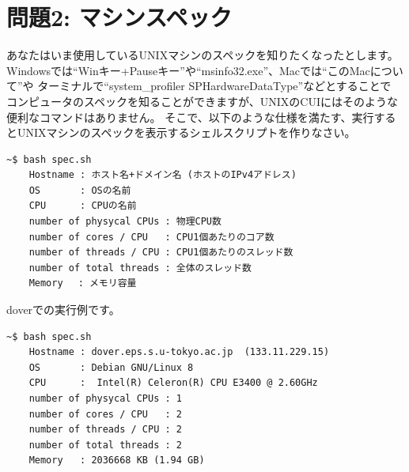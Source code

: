 \documentclass[a4j]{ltjreport}
\begin{document}
    \section*{問題2: マシンスペック}
    あなたはいま使用しているUNIXマシンのスペックを知りたくなったとします。
    Windowsでは``Winキー+Pauseキー''や``msinfo32.exe''、Macでは``このMacについて''や
    ターミナルで``system\_profiler SPHardwareDataType''などとすることで
    コンピュータのスペックを知ることができますが、UNIXのCUIにはそのような便利なコマンドはありません。
    そこで、以下のような仕様を満たす、実行するとUNIXマシンのスペックを表示するシェルスクリプトを作りなさい。

    \begin{lstlisting}[numbers=none]
    ~$ bash spec.sh
    Hostname : ホスト名+ドメイン名 (ホストのIPv4アドレス)
    OS       : OSの名前
    CPU      : CPUの名前
    number of physycal CPUs : 物理CPU数　 
    number of cores / CPU   : CPU1個あたりのコア数　 
    number of threads / CPU : CPU1個あたりのスレッド数　 
    number of total threads : 全体のスレッド数
    Memory　 : メモリ容量
    \end{lstlisting}

    doverでの実行例です。
    \begin{lstlisting}[numbers=none]
    ~$ bash spec.sh
    Hostname : dover.eps.s.u-tokyo.ac.jp  (133.11.229.15)
    OS       : Debian GNU/Linux 8
    CPU      :  Intel(R) Celeron(R) CPU E3400 @ 2.60GHz
    number of physycal CPUs : 1
    number of cores / CPU   : 2
    number of threads / CPU : 2
    number of total threads : 2
    Memory   : 2036668 KB (1.94 GB)
    \end{lstlisting}
\end{document}
